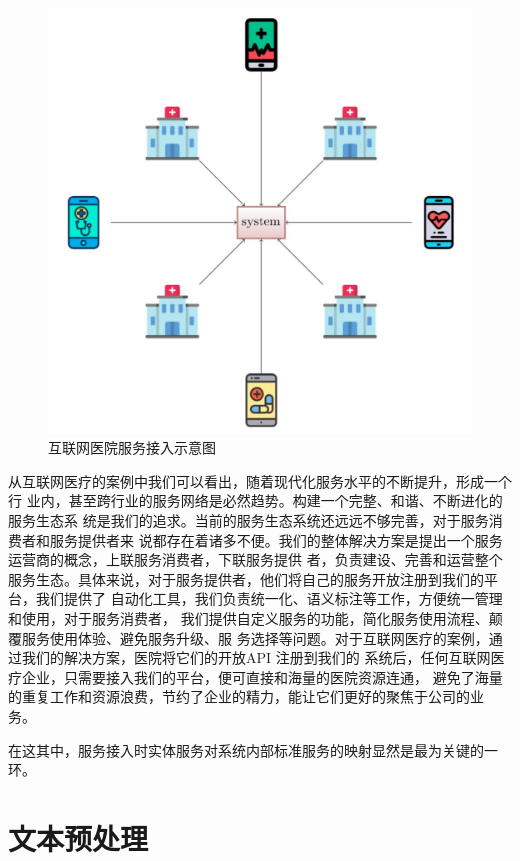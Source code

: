 \begin{figure}[htbp]
    \centering
    \includegraphics[scale=0.5]{./images/serverAdvise.jpg}
    \caption{互联网医院服务接入示意图}
    \label{fig:serverAdvise}
  \end{figure}

从互联网医疗的案例中我们可以看出，随着现代化服务水平的不断提升，形成一个行
业内，甚至跨行业的服务网络是必然趋势。构建一个完整、和谐、不断进化的服务生态系
统是我们的追求。当前的服务生态系统还远远不够完善，对于服务消费者和服务提供者来
说都存在着诸多不便。我们的整体解决方案是提出一个服务运营商的概念，上联服务消费者，下联服务提供
者，负责建设、完善和运营整个服务生态。具体来说，对于服务提供者，他们将自己的服务开放注册到我们的平台，我们提供了
自动化工具，我们负责统一化、语义标注等工作，方便统一管理和使用，对于服务消费者，
我们提供自定义服务的功能，简化服务使用流程、颠覆服务使用体验、避免服务升级、服
务选择等问题。对于互联网医疗的案例，通过我们的解决方案，医院将它们的开放API 注册到我们的
系统后，任何互联网医疗企业，只需要接入我们的平台，便可直接和海量的医院资源连通，
避免了海量的重复工作和资源浪费，节约了企业的精力，能让它们更好的聚焦于公司的业
务。

在这其中，服务接入时实体服务对系统内部标准服务的映射显然是最为关键的一环。

\section{文本预处理}

